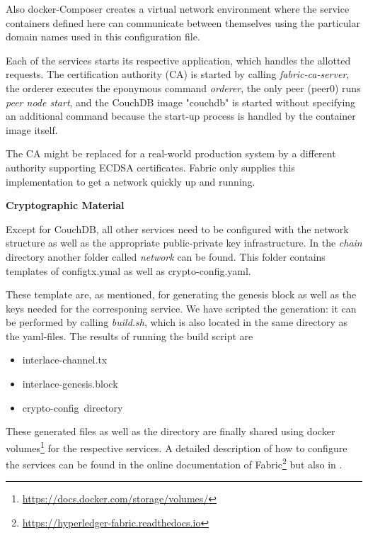 Also docker-Composer creates a virtual network environment where the service containers defined here can communicate between themselves using the particular domain names used in this configuration file.

Each of the services starts its respective application, which handles the allotted requests. The certification authority (CA) is started by calling \textit{fabric-ca-server}, the orderer executes the eponymous command \textit{orderer}, the only peer (peer0) runs \textit{peer node start}, and the CouchDB image "couchdb" is started without specifying an additional command because the start-up process is handled by the container image itself.   

The CA might be replaced for a real-world production system by a different authority supporting ECDSA certificates. Fabric only supplies this implementation to get a network quickly up and running.

\textbf{Cryptographic Material}

Except for CouchDB, all other services need to be configured with the network structure as well as the appropriate public-private key infrastructure. In the \textit{chain} directory another folder called \textit{network} can be found. This folder contains templates of configtx.ymal as well as crypto-config.yaml. 

These template are, as mentioned, for generating the genesis block as well as the keys needed for the corresponing service. We have scripted the generation: it can be performed by calling \textit{build.sh}, which is also located in the same directory as the yaml-files. The results of running the build script are
\begin{itemize}
	\item interlace-channel.tx
	\item interlace-genesis.block
	\item crypto-config\ directory
\end{itemize}
These generated files as well as the directory are finally shared using docker volumes\footnote{\url{https://docs.docker.com/storage/volumes/}} for the respective services. A detailed description of how to configure the services can be found in the online documentation of Fabric\footnote{\url{https://hyperledger-fabric.readthedocs.io}} but also in \cite{HandsOnBlockchainHyperledger2018}.


